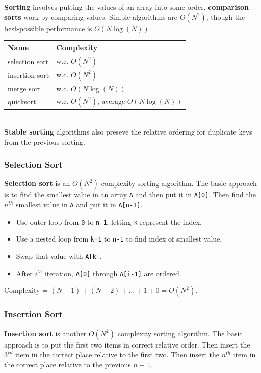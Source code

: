 \textbf{Sorting} involves putting the values of an array into some order. \textbf{comparison sorts} work by comparing values. Simple algorithms are $O(N^{2})$, though the best-possible performance is $O(N\log(N))$. \\

\begin{tabular}{p{}p{}}
Name & Complexity \\
\hline
selection sort & w.c. $O(N^{2})$ \\
insertion sort & w.c. $O(N^{2})$ \\
merge sort & w.c. $O(N \log(N))$ \\
quicksort & w.c. $O(N^{2})$, average $O(N \log(N))$ \\
\end{tabular} \\

\textbf{Stable sorting} algorithms also preseve the relative ordering for duplicate keys from the previous sorting. 

\subsubsection{Selection Sort}

\textbf{Selection sort} is an $O(N^{2})$ complexity sorting algorithm. The basic approach is to find the smallest value in an array \texttt{A} and then put it in \texttt{A[0]}. Then find the $n^{th}$ smallest value in \texttt{A} and put it in \texttt{A[n-1]}.

\begin{itemize}
	\item Use outer loop from \texttt{0} to \texttt{n-1}, letting \texttt{k} represent the index.
	\item Use a nested loop from \texttt{k+1} to \texttt{n-1} to find index of smallest value.
	\item Swap that value with \texttt{A[k]}. 
	\item After $i^{th}$ iteration, \texttt{A[0]} through \texttt{A[i-1]} are ordered.
\end{itemize}

Complexity = $(N-1) + (N-2) + ... + 1 + 0 = O(N^{2})$.

\subsubsection{Insertion Sort}

\textbf{Insertion sort} is another $O(N^{2})$ complexity sorting algorithm. The basic approach is to put the first two items in correct relative order. Then insert the $3^{rd}$ item in the correct place relative to the first two. Then insert the $n^{th}$ item in the correct place relative to the previous $n-1$. 

